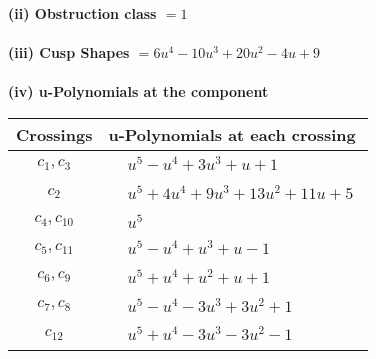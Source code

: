 \documentclass[1p]{elsarticle_modified}
\theoremstyle{definition}
\begin{document}
\flushleft \textbf{(ii) Obstruction class $= 1$}\\~\\
\flushleft \textbf{(iii) Cusp Shapes $= 6 u^4-10 u^3+20 u^2-4 u+9$}\\~\\
\newpage\renewcommand{\arraystretch}{1}
\flushleft \textbf{(iv) u-Polynomials at the component}\newline \\
\begin{tabular}{m{50pt}|m{274pt}}
Crossings & \hspace{64pt}u-Polynomials at each crossing \\
\hline $$\begin{aligned}c_{1},c_{3}\end{aligned}$$&$\begin{aligned}
&u^5- u^4+3 u^3+u+1
\end{aligned}$\\
\hline $$\begin{aligned}c_{2}\end{aligned}$$&$\begin{aligned}
&u^5+4 u^4+9 u^3+13 u^2+11 u+5
\end{aligned}$\\
\hline $$\begin{aligned}c_{4},c_{10}\end{aligned}$$&$\begin{aligned}
&u^5
\end{aligned}$\\
\hline $$\begin{aligned}c_{5},c_{11}\end{aligned}$$&$\begin{aligned}
&u^5- u^4+u^3+u-1
\end{aligned}$\\
\hline $$\begin{aligned}c_{6},c_{9}\end{aligned}$$&$\begin{aligned}
&u^5+u^4+u^2+u+1
\end{aligned}$\\
\hline $$\begin{aligned}c_{7},c_{8}\end{aligned}$$&$\begin{aligned}
&u^5- u^4-3 u^3+3 u^2+1
\end{aligned}$\\
\hline $$\begin{aligned}c_{12}\end{aligned}$$&$\begin{aligned}
&u^5+u^4-3 u^3-3 u^2-1
\end{aligned}$\\
\hline
\end{tabular}\\~\\
\end{document}
